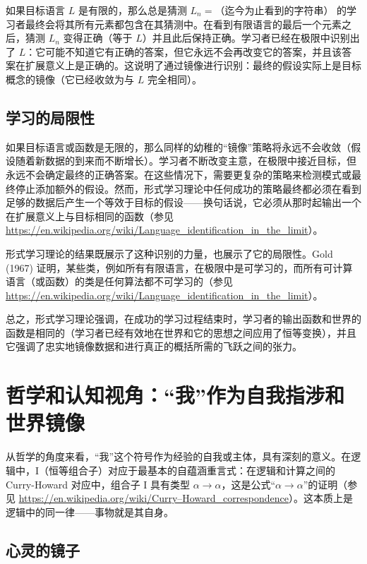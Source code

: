 \documentclass[12pt]{article}
\begin{document}
如果目标语言 \( L \) 是有限的，那么总是猜测 \( L_n = \text{（迄今为止看到的字符串）} \) 的学习者最终会将其所有元素都包含在其猜测中。在看到有限语言的最后一个元素之后，猜测 \( L_n \) 变得正确（等于 \( L \)）并且此后保持正确。学习者已经在极限中识别出了 \( L \)：它可能不知道它有正确的答案，但它永远不会再改变它的答案，并且该答案在扩展意义上是正确的。这说明了通过镜像进行识别：最终的假设实际上是目标概念的镜像（它已经收敛为与 \( L \) 完全相同）。

\subsection{学习的局限性}

如果目标语言或函数是无限的，那么同样的幼稚的“镜像”策略将永远不会收敛（假设随着新数据的到来而不断增长）。学习者不断改变主意，在极限中接近目标，但永远不会确定最终的正确答案。在这些情况下，需要更复杂的策略来检测模式或最终停止添加额外的假设。然而，形式学习理论中任何成功的策略最终都必须在看到足够的数据后产生一个等效于目标的假设——换句话说，它必须从那时起输出一个在扩展意义上与目标相同的函数（参见 \url{https://en.wikipedia.org/wiki/Language_identification_in_the_limit}）。

形式学习理论的结果既展示了这种识别的力量，也展示了它的局限性。Gold (1967) 证明，某些类，例如所有有限语言，在极限中是可学习的，而所有可计算语言（或函数）的类是任何算法都不可学习的（参见 \url{https://en.wikipedia.org/wiki/Language_identification_in_the_limit}）。

总之，形式学习理论强调，在成功的学习过程结束时，学习者的输出函数和世界的函数是相同的（学习者已经有效地在世界和它的思想之间应用了恒等变换），并且它强调了忠实地镜像数据和进行真正的概括所需的飞跃之间的张力。

\section{哲学和认知视角：“我”作为自我指涉和世界镜像}

从哲学的角度来看，“我”这个符号作为经验的自我或主体，具有深刻的意义。在逻辑中，I（恒等组合子）对应于最基本的自蕴涵重言式：在逻辑和计算之间的 Curry-Howard 对应中，组合子 I 具有类型 \( \alpha \to \alpha \)，这是公式“\( \alpha \to \alpha \)”的证明（参见 \url{https://en.wikipedia.org/wiki/Curry–Howard_correspondence}）。这本质上是逻辑中的同一律——事物就是其自身。

\subsection{心灵的镜子}
\end{document}
